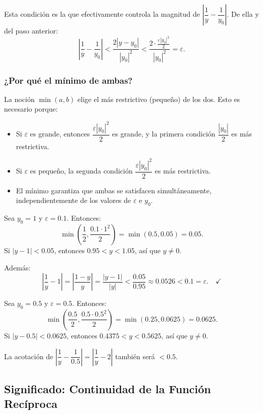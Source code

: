 Esta condición es la que efectivamente controla la magnitud de $\left|\dfrac{1}{y} - \dfrac{1}{y_0}\right|$. De ella y del paso anterior:
\[
\left|\frac{1}{y} - \frac{1}{y_0}\right| < \frac{2|y - y_0|}{|y_0|^2} < \frac{2 \cdot \frac{\varepsilon|y_0|^2}{2}}{|y_0|^2} = \varepsilon.
\]

\subsubsection*{¿Por qué el mínimo de ambas?}

La noción $\min(a, b)$ elige el más restrictivo (pequeño) de los dos. Esto es necesario porque:
\begin{itemize}
\item Si $\varepsilon$ es grande, entonces $\dfrac{\varepsilon|y_0|^2}{2}$ es grande, y la primera condición $\dfrac{|y_0|}{2}$ es más restrictiva.
\item Si $\varepsilon$ es pequeño, la segunda condición $\dfrac{\varepsilon|y_0|^2}{2}$ es más restrictiva.
\item El mínimo garantiza que ambas se satisfacen simultáneamente, independientemente de los valores de $\varepsilon$ e $y_0$.
\end{itemize}

\begin{ejemplo}
Sea $y_0 = 1$ y $\varepsilon = 0.1$. Entonces:
\[
\min\left(\frac{1}{2}, \frac{0.1 \cdot 1^2}{2}\right) = \min(0.5, 0.05) = 0.05.
\]
Si $|y - 1| < 0.05$, entonces $0.95 < y < 1.05$, así que $y \neq 0$.

Además:
\[
\left|\frac{1}{y} - 1\right| = \left|\frac{1 - y}{y}\right| = \frac{|y - 1|}{|y|} < \frac{0.05}{0.95} \approx 0.0526 < 0.1 = \varepsilon. \quad ✓
\]
\end{ejemplo}

\begin{ejemplo}
Sea $y_0 = 0.5$ y $\varepsilon = 0.5$. Entonces:
\[
\min\left(\frac{0.5}{2}, \frac{0.5 \cdot 0.5^2}{2}\right) = \min(0.25, 0.0625) = 0.0625.
\]
Si $|y - 0.5| < 0.0625$, entonces $0.4375 < y < 0.5625$, así que $y \neq 0$.

La acotación de $\left|\dfrac{1}{y} - \dfrac{1}{0.5}\right| = \left|\dfrac{1}{y} - 2\right|$ también será $< 0.5$.
\end{ejemplo}

\subsection*{Significado: Continuidad de la Función Recíproca}

